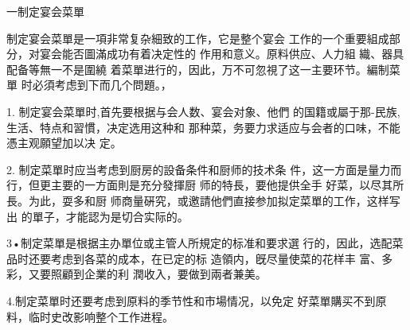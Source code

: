 一制定宴会菜單

制定宴会菜單是一項非常复杂細致的工作，它是整个宴会 工作的一个重要組成部分，对宴会能否圖滿成功有着决定性的 作用和意义。原料供应、人力組
織、器具配备等無一不是圍繞 着菜單进行的，因此，万不可忽視了这一主要环节。編制菜單 时必須考虑到下而几个問題。，

1.      制定宴会菜單时,首先要根据与会人数、宴会对象、他們 的国籍或屬于那-民族,生活、特点和習慣，决定选用这种和 那种菜，务要力求适应与会者的口味，不能憑主观願望加以决 定。

2.      制定菜單时应当考虑到厨房的設备条件和厨师的技术条 件，这一方面是量力而行，但更主要的一方面則是充分發揮厨 师的特長，要他提供全手
好菜，以尽其所長。为此，耍多和厨 师商量硏究，或邀請他們直接参加拟定菜單的工作，这样写出 的單子，才能認为是切合实际的。

3•制定菜單是根据主办單位或主管人所規定的标准和要求選 行的，因此，选配菜品时还要考虑到各菜的成本，在已定的标 造領内，旣尽量使菜的花样丰
富、多彩，又要照顧到企業的利 潤收入，要做到兩者兼美。

4.制定菜單时还要考虑到原料的季节性和市場情况，以免定 好菜單購买不到原料，临时史改影响整个工作进程。
